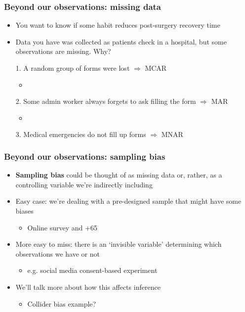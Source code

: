 \documentclass[aspectratio=43]{beamer}
\begin{document}
\begin{frame}
\frametitle{Beyond our observations: missing data}
\centering

\begin{itemize}
  \item You want to know if some habit reduces post-surgery recovery time
  \item Data you have was collected as patients check in a hospital, but some observations are missing. Why?
  \item[1.] A random group of forms were lost $\Rightarrow$ MCAR
  \begin{itemize}
    \item {\color{asher}{\small (although...)}}
  \end{itemize}
  \item[2.] Some admin worker always forgets to ask filling the form $\Rightarrow$ MAR
  \begin{itemize}
    \item {\color{asher}{\small (although...)}}
  \end{itemize}
  \item[3.] Medical emergencies do not fill up forms $\Rightarrow$ MNAR
\end{itemize}

\end{frame}

\begin{frame}
\frametitle{Beyond our observations: sampling bias}
\centering

\begin{itemize}
  \item \textbf{Sampling bias} could be thought of as missing data or, rather, as a controlling variable we're indirectly including
  \item Easy case: we're dealing with a pre-designed sample that might have some biases
  \begin{itemize}
    \item Online survey and +65
  \end{itemize}
  \item<2-> More easy to miss: there is an `invisible variable' determining which observations we have or not
  \begin{itemize}
    \item e.g. social media consent-based experiment
  \end{itemize}
  \item<2-> We'll talk more about how this affects inference
  \begin{itemize}
    \item Collider bias example?
  \end{itemize}
\end{itemize}

\end{frame}
\end{document}
